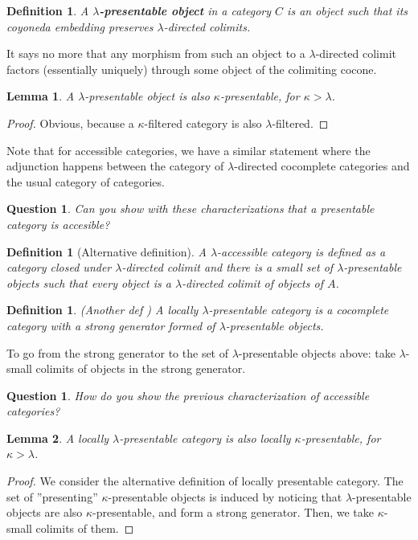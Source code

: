 \documentclass{article}
\newtheorem{definition}[theorem]{Definition}
\newtheorem{question}[theorem]{Question}
\newtheorem{lemma}{Lemma}
\begin{document}
  \begin{definition}
    A \textbf{$\lambda$-presentable object} in a category $C$ is an object such
    that its coyoneda embedding preserves $\lambda$-directed colimits.
  \end{definition}
  It says no more that any morphism from such an object to a $\lambda$-directed
  colimit factors (essentially uniquely) through some object of the colimiting cocone.
  \begin{lemma}
   A $\lambda$-presentable object is also $\kappa$-presentable, for $\kappa > \lambda$.
  \end{lemma}
  \begin{proof}
	  Obvious, because a $\kappa$-filtered category is also $\lambda$-filtered.
  \end{proof}
  Note that for accessible categories, we have a similar statement
  \cite[2.26]{adamek_rosicky} where the adjunction happens between the category
  of $\lambda$-directed cocomplete categories and the usual category of categories.
  \begin{question}
   Can you show with these characterizations that a presentable category is
   accesible? 
  \end{question}
  \begin{definition}[Alternative definition]
  A $\lambda$-accessible category is defined as a category closed
  under $\lambda$-directed colimit and there is a small set of
  $\lambda$-presentable objects such that every object is a $\lambda$-directed
  colimit of objects of $A$.
  \end{definition}
  \begin{definition}
	  (Another def \cite[1.20]{adamek_rosicky})
    A locally $\lambda$-presentable category is a cocomplete category
    with a strong generator formed of $\lambda$-presentable objects.
  \end{definition}
  To go from the strong generator to the set of $\lambda$-presentable objects
  above: take $\lambda$-small colimits of objects in the strong generator.
  \begin{question}
    How do you show the previous characterization of accessible categories?
\end{question}
\begin{lemma}
   A locally $\lambda$-presentable category is also locally $\kappa$-presentable, for $\kappa > \lambda$.
\end{lemma}
\begin{proof}
  We consider the alternative definition of locally presentable category.
  The set of ''presenting'' $\kappa$-presentable objects is induced by noticing that
  $\lambda$-presentable objects are also $\kappa$-presentable, and form a strong
  generator. Then, we take $\kappa$-small colimits of them.
\end{proof}
\end{document}
